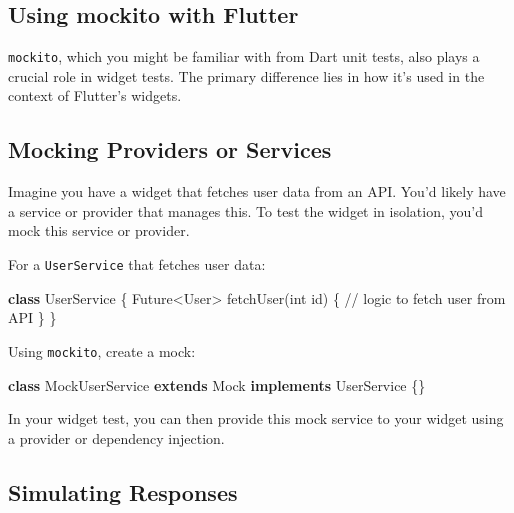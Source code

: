 \documentclass[
]{article}
\newenvironment{Shaded}{\begin{snugshade}}{\end{snugshade}}
\newcommand{\CommentTok}[1]{\textcolor[rgb]{0.48,0.49,0.49}{#1}}
\newcommand{\DataTypeTok}[1]{\textcolor[rgb]{0.16,0.50,0.73}{#1}}
\newcommand{\KeywordTok}[1]{\textcolor[rgb]{0.81,0.81,0.76}{\textbf{#1}}}
\newcommand{\NormalTok}[1]{\textcolor[rgb]{0.81,0.81,0.76}{#1}}
\newcommand{\OperatorTok}[1]{\textcolor[rgb]{0.81,0.81,0.76}{#1}}
\begin{document}
\subsection{Using mockito with
Flutter}\label{using-mockito-with-flutter}

\texttt{mockito}, which you might be familiar with from Dart unit tests,
also plays a crucial role in widget tests. The primary difference lies
in how it's used in the context of Flutter's widgets.

\subsection{Mocking Providers or
Services}\label{mocking-providers-or-services}

Imagine you have a widget that fetches user data from an API. You'd
likely have a service or provider that manages this. To test the widget
in isolation, you'd mock this service or provider.

For a \texttt{UserService} that fetches user data:

\begin{Shaded}
\begin{Highlighting}[]
\KeywordTok{class}\NormalTok{ UserService }\OperatorTok{\{}
  \DataTypeTok{Future}\OperatorTok{\textless{}}\NormalTok{User}\OperatorTok{\textgreater{}}\NormalTok{ fetchUser(}\DataTypeTok{int}\NormalTok{ id) }\OperatorTok{\{}
    \CommentTok{// logic to fetch user from API}
  \OperatorTok{\}}
\OperatorTok{\}}
\end{Highlighting}
\end{Shaded}

Using \texttt{mockito}, create a mock:

\begin{Shaded}
\begin{Highlighting}[]
\KeywordTok{class}\NormalTok{ MockUserService }\KeywordTok{extends}\NormalTok{ Mock }\KeywordTok{implements}\NormalTok{ UserService }\OperatorTok{\{\}}
\end{Highlighting}
\end{Shaded}

In your widget test, you can then provide this mock service to your
widget using a provider or dependency injection.

\subsection{Simulating Responses}\label{simulating-responses}
\end{document}
